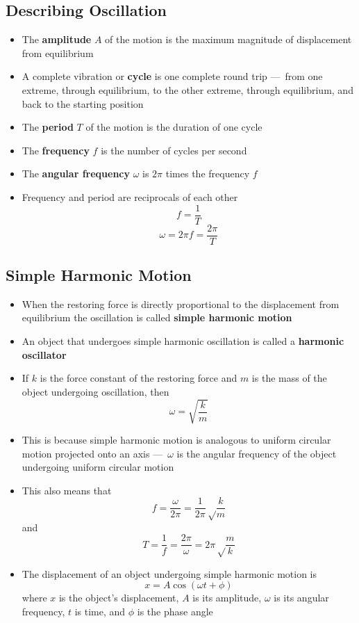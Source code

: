 \documentclass{article}
\begin{document}
\subsection{Describing Oscillation}

\begin{itemize}
    \item The \textbf{amplitude} $A$ of the motion is the maximum magnitude of displacement from equilibrium

    \item A complete vibration or \textbf{cycle} is one complete round trip — from one extreme, through equilibrium, to the other extreme, through equilibrium, and back to the starting position

    \item The \textbf{period} $T$ of the motion is the duration of one cycle

    \item The \textbf{frequency} $f$ is the number of cycles per second

    \item The \textbf{angular frequency} $\omega$ is $2\pi$ times the frequency $f$

    \item Frequency and period are reciprocals of each other \[f = \frac 1 T\] \[\omega = 2\pi f = \frac {2\pi} T\]
\end{itemize}

\subsection{Simple Harmonic Motion}

\begin{itemize}
    \item When the restoring force is directly proportional to the displacement from equilibrium the oscillation is called \textbf{simple harmonic motion}

    \item An object that undergoes simple harmonic oscillation is called a \textbf{harmonic oscillator}

    \item If $k$ is the force constant of the restoring force and $m$ is the mass of the object undergoing oscillation, then \[\omega = \sqrt{\frac{k}{m}}\]

    \item This is because simple harmonic motion is analogous to uniform circular motion projected onto an axis — $\omega$ is the angular frequency of the object undergoing uniform circular motion

    \item This also means that \[f = \frac \omega {2 \pi} = \frac 1 {2\pi} \sqrt \frac k m\] and \[T = \frac 1 f = \frac {2\pi} \omega = 2 \pi \sqrt \frac m k\]

    \item The displacement of an object undergoing simple harmonic motion is \[x = A\cos(\omega t + \phi)\] where $x$ is the object's displacement, $A$ is its amplitude, $\omega$ is its angular frequency, $t$ is time, and $\phi$ is the phase angle
\end{itemize}
\end{document}

